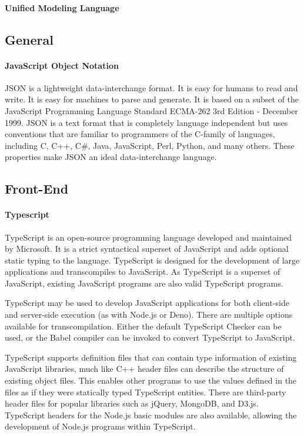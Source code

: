\paragraph{Unified Modeling Language}

\subsection{General}
\paragraph{JavaScript Object Notation}
\ac{JSON} is a lightweight data-interchange format. It is easy for humans to read and write. It is easy for machines to parse and generate. It is based on a subset of the JavaScript Programming Language Standard ECMA-262 3rd Edition - December 1999. \ac{JSON} is a text format that is completely language independent but uses conventions that are familiar to programmers of the C-family of languages, including C, C++, C\#, Java, JavaScript, Perl, Python, and many others. These properties make \ac{JSON} an ideal data-interchange language.

\subsection{Front-End}
\paragraph{Typescript}
TypeScript is an open-source programming language developed and maintained by Microsoft. It is a strict syntactical superset of JavaScript and adds optional static typing to the language. TypeScript is designed for the development of large applications and transcompiles to JavaScript. As TypeScript is a superset of JavaScript, existing JavaScript programs are also valid TypeScript programs.

TypeScript may be used to develop JavaScript applications for both client-side and server-side execution (as with Node.js or Deno). There are multiple options available for transcompilation. Either the default TypeScript Checker can be used, or the Babel compiler can be invoked to convert TypeScript to JavaScript.

TypeScript supports definition files that can contain type information of existing JavaScript libraries, much like C++ header files can describe the structure of existing object files. This enables other programs to use the values defined in the files as if they were statically typed TypeScript entities. There are third-party header files for popular libraries such as jQuery, MongoDB, and D3.js. TypeScript headers for the Node.js basic modules are also available, allowing the development of Node.js programs within TypeScript.

